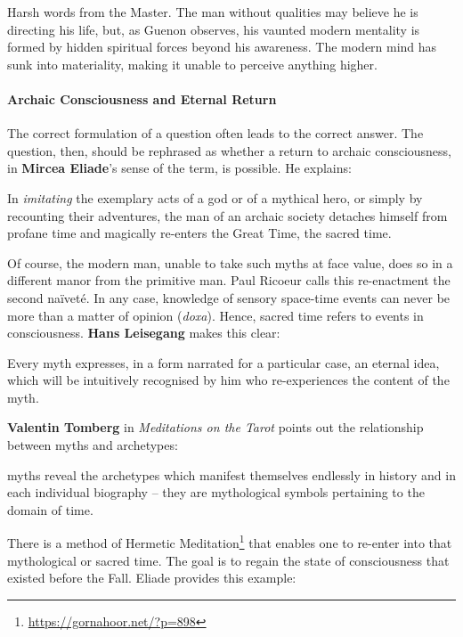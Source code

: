 Harsh words from the Master. The man without qualities may believe he is directing his life, but, as Guenon observes, his vaunted modern mentality is formed by hidden spiritual forces beyond his awareness. The modern mind has sunk into materiality, making it unable to perceive anything higher.

\paragraph{Archaic Consciousness and Eternal Return}


The correct formulation of a question often leads to the correct answer. The question, then, should be rephrased as whether a return to archaic consciousness, in \textbf{Mircea Eliade}'s sense of the term, is possible. He explains:

\begin{quotex}
In \emph{imitating} the exemplary acts of a god or of a mythical hero, or simply by recounting their adventures, the man of an archaic society detaches himself from profane time and magically re-enters the Great Time, the sacred time.
\end{quotex}


Of course, the modern man, unable to take such myths at face value, does so in a different manor from the primitive man. Paul Ricoeur calls this re-enactment the second naïveté. In any case, knowledge of sensory space-time events can never be more than a matter of opinion (\emph{doxa}). Hence, sacred time refers to events in consciousness.
\textbf{Hans Leisegang} makes this clear:


\begin{quotex}
Every myth expresses, in a form narrated for a particular case, an eternal idea, which will be intuitively recognised by him who re-experiences the content of the myth.
\end{quotex}


\textbf{Valentin Tomberg} in \emph{Meditations on the Tarot} points out the relationship between myths and archetypes:

\begin{quotex}
myths reveal the archetypes which manifest themselves endlessly in history and in each individual biography -- they are mythological symbols pertaining to the domain of time.
\end{quotex}


There is a method of Hermetic Meditation\footnote{\url{https://gornahoor.net/?p=898}} that enables one to re-enter into that mythological or sacred time. The goal is to regain the state of consciousness that existed before the Fall. Eliade provides this example:

